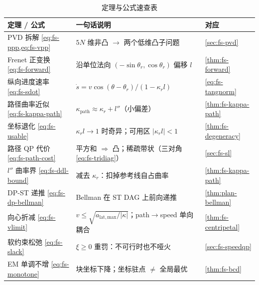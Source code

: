 \begin{table}[H]\centering\small
\caption{定理与公式速查表}
\label{tab:fs-quickref}
\begin{tabular}{lll}
\toprule
定理 / 公式 & 一句话说明 & 对应 \\
\midrule
PVD 拆解 \cref{eq:fs-ppp,eq:fs-vpp} & $5N$ 维非凸 $\to$ 两个低维凸子问题 & \cref{sec:fs-pvd} \\
Frenet 正变换 \cref{eq:fs-forward} & 沿单位法向 $(-\sin\theta_r,\cos\theta_r)$ 偏移 $l$ & \cref{thm:fs-forward} \\
纵向进度速率 \cref{eq:fs-sdot} & $\dot s=v\cos(\theta-\theta_r)/(1-\kappa_r l)$ & \cref{eq:fs-tangnorm} \\
路径曲率近似 \cref{eq:fs-kappa-path} & $\kappa_{\mathrm{path}}\approx\kappa_r+l''$（小偏差） & \cref{thm:fs-kappa-path} \\
坐标退化 \cref{eq:fs-usable} & $\kappa_r l\to1$ 时奇异；可用区 $|\kappa_r l|<1$ & \cref{thm:fs-degeneracy} \\
路径 QP 代价 \cref{eq:fs-path-cost} & 平方和 $\Rightarrow$ 凸；稀疏带状（三对角 \cref{eq:fs-tridiag}） & \cref{sec:fs-sl} \\
$l''$ 曲率界 \cref{eq:fs-ddl-bound} & 减去 $\kappa_r$：扣掉参考线自占曲率 & \cref{thm:fs-kappa-path} \\
DP-ST 递推 \cref{eq:fs-dp-bellman} & Bellman 在 ST DAG 上前向递推 & \cref{thm:plan-bellman} \\
向心折减 \cref{eq:fs-vlimit} & $v\le\sqrt{a_{\mathrm{lat,max}}/|\kappa|}$；path$\to$speed 单向耦合 & \cref{thm:fs-centripetal} \\
软约束松弛 \cref{eq:fs-slack} & $\xi\ge0$ 重罚：不可行时也不哑火 & \cref{sec:fs-speedqp} \\
EM 单调不增 \cref{eq:fs-monotone} & 块坐标下降；坐标驻点 $\ne$ 全局最优 & \cref{thm:fs-bcd} \\
\bottomrule
\end{tabular}
\end{table}

